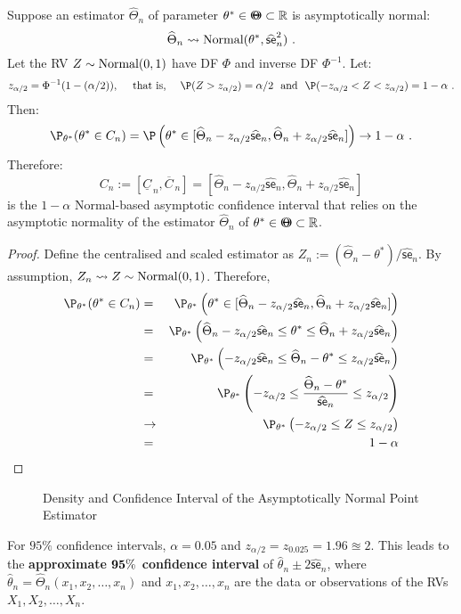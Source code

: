 \begin{prop}\label{P:NormalBasedAsympCI}
Suppose an estimator $\widehat{\Theta}_n$ of  parameter $\theta^* \in {\Theta}\mspace{-11 mu}{\Theta} \subset \mathbb{R}$ is asymptotically normal:
\[
\widehat{\Theta}_n \rightsquigarrow \mbox{{\rm Normal}}(\theta^*,\widehat{\mathsf{se}}_n^2) \ .
\]
Let the RV $Z \sim \mbox{{\rm Normal}}(0,1)$ have DF $\Phi$ and inverse DF $\Phi^{-1}$.  Let:
\[
z_{\alpha/2}=\Phi^{-1}(1-(\alpha/2)), \quad \text{ that is, } \quad \P(Z>z_{\alpha/2})=\alpha/2 \ \text{ and } \ \P(-z_{\alpha/2} < Z < z_{\alpha/2}) = 1-\alpha \ .
\]
Then:
\[
\P_{\theta^*}(\theta^* \in C_n)  = \P \left( \theta^* \in [\widehat{\Theta}_n - z_{\alpha/2} \widehat{\mathsf{se}}_n, \widehat{\Theta}_n + z_{\alpha/2} \widehat{\mathsf{se}}_n] \right) \to 1-\alpha \ .
\]
Therefore:
\[
C_n := [\underline{C}_{\, n}, \overline{C}_{\, n}]
= [\widehat{\Theta}_n - z_{\alpha/2} \widehat{\mathsf{se}}_n, \widehat{\Theta}_n + z_{\alpha/2} \widehat{\mathsf{se}}_n]
\] 
is the $1-\alpha$ Normal-based asymptotic confidence interval that relies on the asymptotic normality of the estimator $\widehat{\Theta}_n$ of $\theta^* \in {\Theta}\mspace{-11 mu}{\Theta} \subset \mathbb{R}$.
{\scriptsize
\begin{proof}
Define the centralised and scaled estimator as $Z_n := (\widehat{\Theta}_n-\theta^*)/\widehat{\mathsf{se}}_n$.  By assumption, $Z_n \rightsquigarrow Z \sim \mbox{{\rm Normal}}(0,1)$.  Therefore,
\begin{eqnarray}
\P_{\theta^*}(\theta^* \in C_n) 
&=& \P_{\theta^*} \left( \theta^* \in [\widehat{\Theta}_n - z_{\alpha/2} \widehat{\mathsf{se}}_n, \widehat{\Theta}_n + z_{\alpha/2} \widehat{\mathsf{se}}_n] \right) \notag \\
&=& \P_{\theta^*} \left( \widehat{\Theta}_n - z_{\alpha/2} \widehat{\mathsf{se}}_n \leq \theta^* \leq  \widehat{\Theta}_n + z_{\alpha/2} \widehat{\mathsf{se}}_n \right) \notag \\
&=& \P_{\theta^*} \left(  - z_{\alpha/2} \widehat{\mathsf{se}}_n \leq \widehat{\Theta}_n - \theta^* \leq   z_{\alpha/2} \widehat{\mathsf{se}}_n \right) \notag \\
&=& \P_{\theta^*} \left(  - z_{\alpha/2}  \leq \frac{\widehat{\Theta}_n - \theta^*}{\widehat{\mathsf{se}}_n} \leq   z_{\alpha/2} \right) \notag \\
&\to& \P_{\theta^*} \left(  - z_{\alpha/2}  \leq Z \leq   z_{\alpha/2} \right) \notag \\
&=& 1-\alpha \notag
\end{eqnarray}
\end{proof}
}
\begin{figure}[htb]
\caption{Density and Confidence Interval of the Asymptotically Normal Point Estimator}
\vspace{4cm}
\end{figure}
For $95\%$ confidence intervals, $\alpha=0.05$ and $z_{\alpha/2}=z_{0.025}=1.96\approxeq 2$.  This leads to the {\bf approximate $\mathbf{95\%}$ confidence interval} of $\widehat{\theta}_n \pm 2 \widehat{\mathsf{se}}_n$, where $\widehat{\theta}_n=\widehat{\Theta}_n(x_1,x_2,\ldots,x_n)$ and $x_1,x_2,\ldots,x_n$ are the data or observations of the RVs $X_1,X_2,\ldots,X_n$.
\end{prop}

